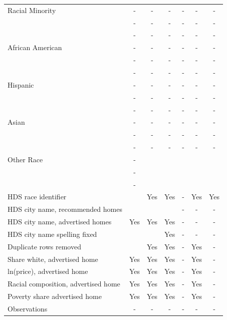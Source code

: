 \begin{table}[htbp]
{\begin{tabular}{l*{6}{c}}
\midrule
Racial Minority     &     -   &     -   &     -  &     -  &     -   & - \\
                    &   -   &    -   &   -   &    -   &    -   & - \\
                    & -   & -   & -   &-   & -   & - \\
\midrule
African American                   &     -   &     -   &     -  &     -  &     -   & - \\
                    &   -   &    -   &   -   &    -   &    -   & - \\
                    & -   & -   & -   &-   & -   & - \\
Hispanic                   &     -   &     -   &     -  &     -  &     -   & - \\
                    &   -   &    -   &   -   &    -   &    -   & - \\
                    & -   & -   & -   &-   & -   & - \\
Asian                   &     -   &     -   &     -  &     -  &     -   & - \\
                    &   -   &    -   &   -   &    -   &    -   & - \\
                    & -   & -   & -   &-   & -   & - \\
Other Race                   &     -   &        &       &       &        &  \\
                    &   -   &       &     &      &      &  \\
                    & -   &    &    &   &   &  \\
\midrule
HDS race identifier & & Yes & Yes & - & Yes & Yes \\
HDS city name, recommended homes &  &  &  &- & - & -\\
HDS city name, advertised homes & Yes & Yes & Yes & - & - & -\\
HDS city name spelling fixed & & & Yes & - & - & -\\
Duplicate rows removed &  & Yes & Yes & - & Yes & - \\
\midrule
Share white, advertised home  & Yes & Yes & Yes & - & Yes & - \\
ln(price), advertised home  & Yes & Yes & Yes & - & Yes & - \\
Racial composition, advertised home & Yes & Yes & Yes & - & Yes & - \\
Poverty share advertised home & Yes & Yes & Yes & - & Yes & - \\
Observations        &        -   &        -   &        -   &        -   &        -   & - \\

\end{tabular}}
\end{table}
